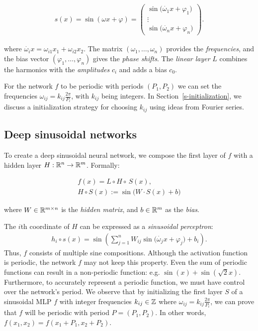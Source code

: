 \begin{align}\label{e-firstlayer}
\displaystyle
    s(x)=\sin(\omega x +\varphi)=
    \left(
    \begin{array}{c}
        \sin\big(\dot{\omega_1}{x}+\varphi_1\big)\\
         {\vdots}\\
         \sin\big(\dot{\omega_{n}}{x}+\varphi_{n}\big)
    \end{array}
    \right).
\end{align}

where $\dot{\omega_i}{x}=\omega_{i1}x_1+\omega_{i2}x_2$. The matrix $(\omega_1, \ldots, \omega_{n})$ provides the \textit{frequencies}, and the bias vector $(\varphi_1, \ldots, \varphi_{n})$ gives the \textit{phase shifts}. The \textit{linear layer} $L$ combines the harmonics with the \textit{amplitudes} $c_i$ and adds a bias $c_0$.

For the network $f$ to be periodic with periods $(P_1,P_2)$ we can set the frequencies $\omega_{ij}=k_{ij}\frac{2\pi}{P_i}$, with $k_{ij}$ being integers. In Section~\ref{s-initialization}, we discuss a initialization strategy for choosing $k_{ij}$ using ideas from Fourier series.

\subsection{Deep sinusoidal networks}\label{s-deep-networks}

To create a deep sinusoidal neural network, we compose the first layer of $f$ with a hidden layer $H:\mathbb{R}^{n}\to \mathbb{R}^{m}$. Formally:

\begin{align}
    f(x) = L\circ H \circ \,S(x),     \\
    H\circ S(x):=\sin\big(W \cdot S(x)+b\big)
\end{align}


where %
$W\in\mathbb{R}^{m\times n}$ is the \textit{hidden matrix}, and $b\in\mathbb{R}^{m}$ as the \textit{bias}.


The $i$th coordinate of $H$ can be expressed as a \textit{sinusoidal perceptron}:
%
\begin{align}
h_{i}\circ s(x)=\sin\left(\sum_{j=1}^{n} W_{ij} \sin\Big(\dot{\omega_j}{x}+\varphi_j\Big) + b_{i}\right).
\end{align}
%
Thus, $f$ consists of multiple sine compositions. Although  the activation function is periodic, the network $f$ may not keep this property. Even the sum of periodic functions can result in a non-periodic function: e.g. $\sin(x)+\sin\left(\sqrt{2}x\right)$. Furthermore, to accurately represent a periodic function, we must have control over the network's period.
We observe that by initializing the first layer $S$ of a sinusoidal MLP $f$ with integer frequencies $k_{ij}\in\mathbb{Z}$ where $\omega_{ij}=k_{ij}\frac{2\pi}{P_i}$, we can prove that $f$ will be periodic with period $P=(P_1,P_{2})$.
In other words, $f(x_1, x_2)=f(x_1+P_1, x_2+P_2)$.

